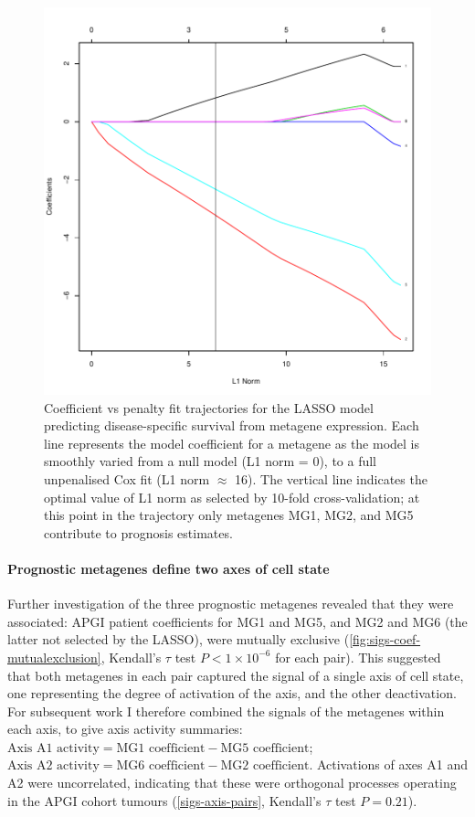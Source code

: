 \documentclass[dissertation.tex]{subfiles}
\begin{document}
\begin{figure}
\centering
\includegraphics[width=.7\linewidth]{analysis/biosurv/reports/18_SIS_diag_dsd_final/figure/nmf-metagene-glmnet-plots-2}
\caption{Coefficient vs penalty fit trajectories for the \acrshort{LASSO} model predicting disease-specific survival from metagene expression.  Each line represents the model coefficient for a metagene as the model is smoothly varied from a null model (L1 norm = 0), to a full unpenalised Cox fit (L1 norm $\approx$ 16).  The vertical line indicates the optimal value of L1 norm as selected by 10-fold cross-validation; at this point in the trajectory only metagenes MG1, MG2, and MG5 contribute to prognosis estimates.\label{fig:sigs-resub-lasso-track}}
\end{figure}

\paragraph{Prognostic metagenes define two axes of cell state}
Further investigation of the three prognostic metagenes revealed that they were associated: \gls{APGI} patient coefficients for MG1 and MG5, and MG2 and MG6 (the latter not selected by the \gls{LASSO}), were mutually exclusive (\cref{fig:sigs-coef-mutualexclusion}, Kendall's $\tau$ test $P < 1 \times 10^{-6}$ for each pair).  This suggested that both metagenes in each pair captured the signal of a single axis of cell state, one representing the degree of activation of the axis, and the other deactivation.  For subsequent work I therefore combined the signals of the metagenes within each axis, to give axis activity summaries: $\text{Axis A1 activity} = \text{MG1 coefficient} - \text{MG5 coefficient}$; $\text{Axis A2 activity} = \text{MG6 coefficient} - \text{MG2 coefficient}$.  Activations of axes A1 and A2 were uncorrelated, indicating that these were orthogonal processes operating in the \gls{APGI} cohort tumours (\cref{sigs-axis-pairs}, Kendall's $\tau$ test $P = 0.21$).
\end{document}
